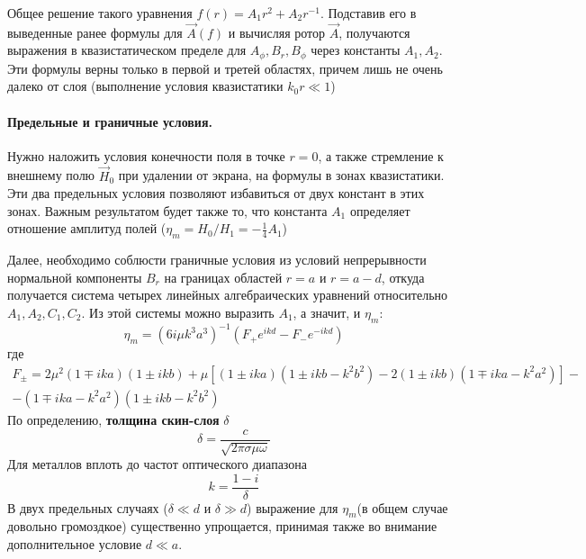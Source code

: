 Общее решение такого уравнения $f(r)=A_1r^2+A_2r^{-1}$. Подставив его в выведенные ранее формулы для $\vec{A}(f)$ и вычисляя ротор $\vec{A}$, получаются выражения в квазистатическом пределе для $A_\phi,B_r,B_\phi$ через константы $A_1, A_2$. Эти формулы верны только в первой и третей областях, причем лишь не очень далеко от слоя (выполнение условия квазистатики $k_0r\ll 1$)


\paragraph{Предельные и граничные условия.} Нужно наложить условия конечности поля в точке $r=0$, а также стремление к внешнему полю $\vec{H}_0$ при удалении от экрана, на формулы в зонах квазистатики. Эти два предельных условия позволяют избавиться от двух констант в этих зонах. Важным результатом будет также то, что константа $A_1$ определяет отношение амплитуд полей ($\eta_m=H_0/H_1=-\frac14A_1$)

Далее, необходимо соблюсти граничные условия из условий непрерывности нормальной компоненты $B_r$ на границах областей $r=a$ и $r=a-d$, откуда получается система четырех линейных алгебраических уравнений относительно $A_1,A_2,C_1,C_2$. Из этой системы можно выразить $A_1$, а значит, и $\eta_m$:
\begin{equation}
	\eta _ { m } = \left( 6 i \mu k ^ { 3 } a ^ { 3 } \right) ^ { - 1 } \left( F _ { + } e ^ { i k d } - F _ { - } e ^ { - i k d } \right)
	\label{eq:etaF}
\end{equation}
где
\begin{gather}
	 F _ { \pm } = 2 \mu ^ { 2 } ( 1 \mp i k a ) ( 1 \pm i k b ) +   \mu \left[ ( 1 \pm i k a ) \left( 1 \pm i k b - k ^ { 2 } b ^ { 2 } \right) - 2 ( 1 \pm i k b ) \left( 1 \mp i k a - k ^ { 2 } a ^ { 2 } \right) \right] - \\ - \left( 1 \mp i k a - k ^ { 2 } a ^ { 2 } \right) \left( 1 \pm i k b - k ^ { 2 } b ^ { 2 } \right) 
\end{gather}
По определению, \textbf{толщина скин-слоя} $\delta$
\begin{equation}
	\delta=\frac{c}{\sqrt{2\pi\sigma\mu\omega}}
\end{equation}
Для металлов вплоть до частот оптического диапазона
\begin{equation}
	k=\frac{1-i}{\delta}
\end{equation}
В двух предельных случаях ($\delta \ll d$  и $\delta \gg d$) выражение для $\eta_{m}$(в общем случае довольно громоздкое) существенно упрощается, принимая также во внимание дополнительное условие $d \ll a$.

